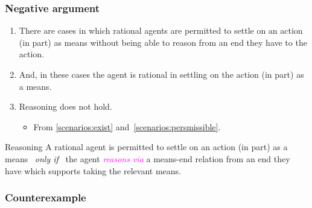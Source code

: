 \documentclass[noamssymb,
graphics,
]{beamer} %
\newcommand{\schemaName}[1]{\textsf{#1}}
\newcommand{\hozlinedash}[0]{
  \noindent\hdashrule[0.5ex][c]{\textwidth}{.1pt}{2.5pt}
}
\begin{document}
\begin{frame}
  \frametitle{Negative argument}

  {%
  \begin{enumerate}
  \item\label{scenarios:exist} There are cases in which rational agents are permitted to settle on an action (in part) as means without being able to reason from an end they have to the action.
  \item\label{scenarios:persmissible} And, in these cases the agent is rational in settling on the action (in part) as a means.
  \item \schemaName{Reasoning} does not hold.
    \begin{itemize}
    \item From \ref{scenarios:exist} and~\ref{scenarios:persmissible}.
    \end{itemize}
  \end{enumerate}
  }

  \hozlinedash
  {\footnotesize
    \begin{block}{Reasoning}
      A rational agent is permitted to settle on an action (in part) as a means
      \newline
      \mbox{ }\hfill\emph{only if}\hfill\mbox{ }
      \newline
      the agent \textcolor{fuchsia}{\emph{reasons via}}  a means-end relation from an end they have which supports taking the relevant means.
    \end{block}
  }
\end{frame}

\subsubsection{Counterexample}
\label{sec:counterexample}
\end{document}
